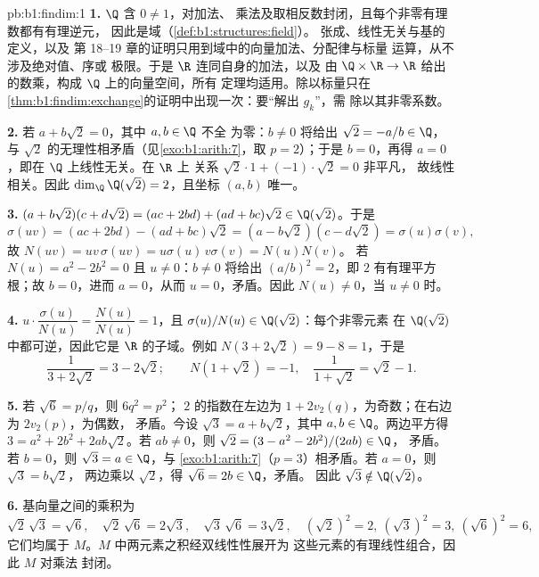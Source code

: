 \begin{solution}{pb:b1:findim:1}
\textbf{1.} $\Q$ 含 $0 \neq 1$，对加法、
乘法及取相反数封闭，且每个非零有理数都有有理逆元，
因此是域（\cref{def:b1:structures:field}）。
张成、线性无关与基的定义，以及
第 18--19 章的证明只用到域中的向量加法、分配律与标量
运算，从不涉及绝对值、序或
极限。于是 $\R$ 连同自身的加法，以及
由 $\Q \times \R \to \R$ 给出的数乘，构成 $\Q$ 上的向量空间，所有
定理均适用。除以标量只在
\cref{thm:b1:findim:exchange}的证明中出现一次：要“解出 $g_k$”，需
除以其非零系数。

\textbf{2.} 若 $a + b\sqrt2 = 0$，其中 $a, b \in \Q$ 不全
为零：$b \neq 0$ 将给出 $\sqrt2 = -a/b \in \Q$，与
$\sqrt2$ 的无理性相矛盾（见\cref{exo:b1:arith:7}，取 $p =
2$）；于是 $b = 0$，再得 $a = 0$，即在 $\Q$ 上线性无关。在 $\R$ 上
关系 $\sqrt2\cdot 1 + (-1)\cdot\sqrt2 = 0$ 非平凡，
故线性相关。因此 $\dim_\Q \Q(\sqrt2) = 2$，且坐标
$(a, b)$ 唯一。

\textbf{3.} $(a + b\sqrt2)(c + d\sqrt2) = (ac + 2bd) + (ad +
bc)\sqrt2 \in \Q(\sqrt2)$。于是
\[
\sigma(uv) = (ac + 2bd) - (ad + bc)\sqrt2
= (a - b\sqrt2)(c - d\sqrt2) = \sigma(u)\sigma(v),
\]
故 $N(uv) = uv\,\sigma(uv) = u\sigma(u)\,v\sigma(v) = N(u)N(v)$。
若 $N(u) = a^2 - 2b^2 = 0$ 且 $u \neq 0$：$b \neq 0$ 将给出
$(a/b)^2 = 2$，即 $2$ 有有理平方根；故 $b = 0$，进而 $a
= 0$，从而 $u = 0$，矛盾。因此 $N(u) \neq 0$，当 $u \neq
0$ 时。

\textbf{4.} $u \cdot \dfrac{\sigma(u)}{N(u)} = \dfrac{N(u)}{N(u)}
= 1$，且 $\sigma(u)/N(u) \in \Q(\sqrt2)$：每个非零元素
在 $\Q(\sqrt2)$ 中都可逆，因此它是
$\R$ 的子域。例如 $N(3 + 2\sqrt2) = 9 - 8 = 1$，于是
\[
\frac1{3 + 2\sqrt2} = 3 - 2\sqrt2 ;
\qquad
N(1 + \sqrt2) = -1, \quad
\frac1{1 + \sqrt2} = \sqrt2 - 1 .
\]

\textbf{5.} 若 $\sqrt6 = p/q$，则 $6q^2 = p^2$；
$2$ 的指数在左边为 $1 + 2v_2(q)$，为奇数；在右边为 $2v_2(p)$，为偶数，
矛盾。今设 $\sqrt3 = a + b\sqrt2$，其中
$a, b \in \Q$。两边平方得 $3 = a^2 + 2b^2 + 2ab\sqrt2$。若 $ab
\neq 0$，则 $\sqrt2 = (3 - a^2 - 2b^2)/(2ab) \in \Q$，
矛盾。若 $b = 0$，则 $\sqrt3 = a \in \Q$，与
\cref{exo:b1:arith:7}（$p = 3$）相矛盾。若 $a = 0$，则 $\sqrt3 = b\sqrt2$，
两边乘以 $\sqrt2$，得 $\sqrt6 = 2b \in \Q$，矛盾。
因此 $\sqrt3 \notin \Q(\sqrt2)$。

\textbf{6.} 基向量之间的乘积为
\[
\sqrt2\,\sqrt3 = \sqrt6,\quad
\sqrt2\,\sqrt6 = 2\sqrt3,\quad
\sqrt3\,\sqrt6 = 3\sqrt2,\quad
(\sqrt2)^2 = 2,\ (\sqrt3)^2 = 3,\ (\sqrt6)^2 = 6,
\]
它们均属于 $M$。$M$ 中两元素之积经双线性性展开为
这些元素的有理线性组合，因此 $M$ 对乘法
封闭。


\end{solution}
